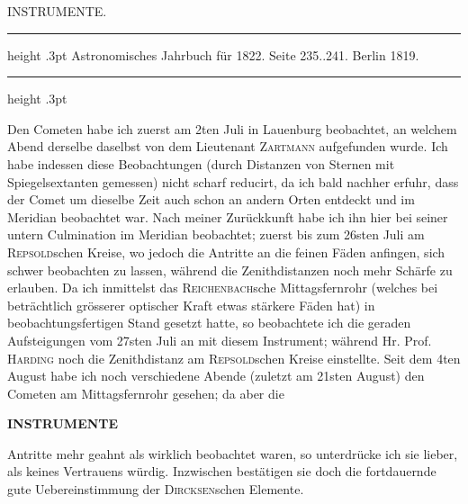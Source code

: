\par\bigskip
{}
\hypertarget{native-429-part-lower}{}
\begin{center}{\Large INSTRUMENTE.}\end{center}
\begin{center}\parbox{.80\linewidth}{\centering\small
\hrule height .3pt\relax\vspace{2.5pt}
Astronomisches Jahrbuch für 1822. Seite 235..241. Berlin 1819.\par
\vspace{2.5pt}\hrule height .3pt\relax
}\end{center}

\par\indent Den Cometen habe ich zuerst am 2ten Juli in Lauenburg beobachtet, an welchem Abend derselbe daselbst von dem Lieutenant \textsc{Zartmann} aufgefunden wurde. Ich habe indessen diese Beobachtungen (durch Distanzen von Sternen mit Spiegelsextanten gemessen) nicht scharf reducirt, da ich bald nachher erfuhr, dass der Comet um dieselbe Zeit auch schon an andern Orten entdeckt und im Meridian beobachtet war. Nach meiner Zurückkunft habe ich ihn hier bei seiner untern Culmination im Meridian beobachtet; zuerst bis zum 26sten Juli am \textsc{Repsold}schen Kreise, wo jedoch die Antritte an die feinen Fäden anfingen, sich schwer beobachten zu lassen, während die Zenithdistanzen noch mehr Schärfe zu erlauben. 
Da ich inmittelst das \textsc{Reichenbach}sche Mittagsfernrohr (welches bei beträchtlich grösserer optischer Kraft etwas stärkere Fäden hat) in beobachtungsfertigen Stand gesetzt hatte, so beobachtete ich die geraden Aufsteigungen vom 27sten Juli an mit diesem Instrument; während Hr. Prof. \textsc{Harding} noch die Zenithdistanz am \textsc{Repsold}schen Kreise einstellte. Seit dem 4ten August habe ich noch verschiedene Abende (zuletzt am 21sten August) den Cometen am Mittagsfernrohr gesehen; da aber die \par
\clearpage
\thispagestyle{empty}
\noindent{}%
\makebox[12mm][l]{}%
\parbox[t]{\dimexpr\linewidth-24mm\relax}{\centering\footnotesize\bfseries INSTRUMENTE\par}%
\par\nobreak\medskip
\noindent Antritte mehr geahnt als wirklich beobachtet waren, so unterdrücke ich sie lieber, als keines Vertrauens würdig. Inzwischen bestätigen sie doch die fortdauernde gute Uebereinstimmung der \textsc{Dircksen}schen Elemente.

